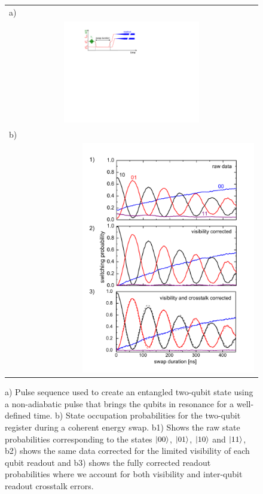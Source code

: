 \begin{figure}[hp!]
	\begin{center}
	\begin{tabular}{l}
	a) \\ \multicolumn{1}{c}{\hspace{0.6cm}\includegraphics[width=0.55\textwidth]{"./material/figures/measurement/qubit_swap"}} \\
	b) \\ \multicolumn{1}{r}{\includegraphics[width=0.7\textwidth]{"./material/papers/iswap/figures/swap_raw_and_corrected"}}
	\end{tabular}
	\end{center}
	\caption[]{a) Pulse sequence used to create an entangled two-qubit state using a non-adiabatic pulse that brings the qubits in resonance for a well-defined time. b) State occupation probabilities for the two-qubit register during a coherent energy swap. b1) Shows the raw state probabilities corresponding to the states $\left| 00 \right>$, $\left| 01 \right>$, $\left| 10 \right>$ and $\left| 11 \right>$, b2) shows the same data corrected for the limited visibility of each qubit readout and b3) shows the fully corrected readout probabilities where we account for both visibility and inter-qubit readout crosstalk errors.}
	\label{fig:swap_raw_and_corrected}
	\label{fig:qubit_swap_pulse_sequence}
\end{figure}

